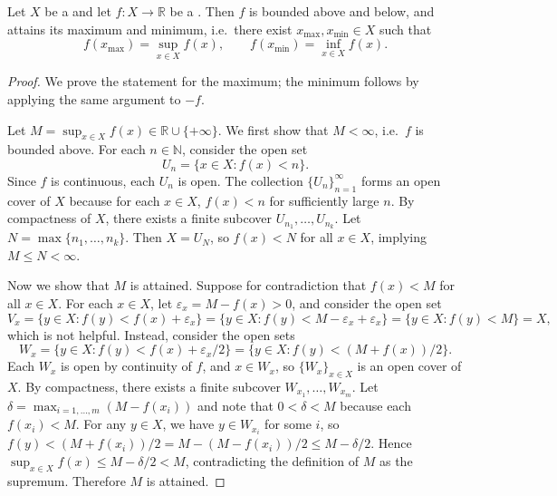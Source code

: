 \begin{proposition} \label{proposition:continuous_real_valued_function_on_compact_topological_space_attains_maximum_and_minimum}
    Let $X$ be a  and let $f : X \to \mathbb{R}$ be a . Then $f$ is bounded above and below, and attains its maximum and minimum, i.e.\ there exist $x_{\max}, x_{\min} \in X$ such that
    $$f(x_{\max}) = \sup_{x \in X} f(x), \qquad f(x_{\min}) = \inf_{x \in X} f(x).$$
\end{proposition}

\begin{proof}
    We prove the statement for the maximum; the minimum follows by applying the same argument to $-f$.

    Let $M = \sup_{x \in X} f(x) \in \mathbb{R} \cup \{+\infty\}$. We first show that $M < \infty$, i.e.\ $f$ is bounded above. For each $n \in \mathbb{N}$, consider the open set
    $$U_n = \{x \in X : f(x) < n\}.$$
    Since $f$ is continuous, each $U_n$ is open. The collection $\{U_n\}_{n=1}^\infty$ forms an open cover of $X$ because for each $x \in X$, $f(x) < n$ for sufficiently large $n$. By compactness of $X$, there exists a finite subcover $U_{n_1}, \dots, U_{n_k}$. Let $N = \max\{n_1, \dots, n_k\}$. Then $X = U_N$, so $f(x) < N$ for all $x \in X$, implying $M \le N < \infty$.

    Now we show that $M$ is attained. Suppose for contradiction that $f(x) < M$ for all $x \in X$. For each $x \in X$, let $\varepsilon_x = M - f(x) > 0$, and consider the open set
    $$V_x = \{y \in X : f(y) < f(x) + \varepsilon_x\} = \{y \in X : f(y) < M - \varepsilon_x + \varepsilon_x\} = \{y \in X : f(y) < M\} = X,$$
    which is not helpful. Instead, consider the open sets
    $$W_x = \{y \in X : f(y) < f(x) + \varepsilon_x/2\} = \{y \in X : f(y) < (M + f(x))/2\}.$$
    Each $W_x$ is open by continuity of $f$, and $x \in W_x$, so $\{W_x\}_{x \in X}$ is an open cover of $X$. By compactness, there exists a finite subcover $W_{x_1}, \dots, W_{x_m}$. Let $\delta = \max_{i=1,\dots,m} (M - f(x_i))$ and note that $0 < \delta < M$ because each $f(x_i) < M$. For any $y \in X$, we have $y \in W_{x_i}$ for some $i$, so $f(y) < (M + f(x_i))/2 = M - (M - f(x_i))/2 \le M - \delta/2$. Hence $\sup_{x \in X} f(x) \le M - \delta/2 < M$, contradicting the definition of $M$ as the supremum. Therefore $M$ is attained.
\end{proof}